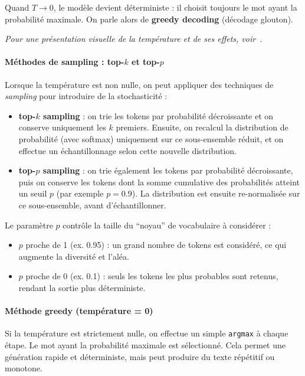 \documentclass[a4paper,11pt]{article}
\begin{document}
Quand $T \to 0$, le modèle devient déterministe : il choisit toujours le mot ayant la probabilité maximale. On parle alors de \textbf{greedy decoding} (décodage glouton).

\vspace{1em}
\textit{Pour une présentation visuelle de la température et de ses effets, voir~\cite{aviral_temperature}.}

\paragraph{Méthodes de sampling : top-$k$ et top-$p$}

Lorsque la température est non nulle, on peut appliquer des techniques de \textit{sampling} pour introduire de la stochasticité :

\begin{itemize}
  \item \textbf{top-$k$ sampling} : on trie les tokens par probabilité décroissante et on conserve uniquement les $k$ premiers. Ensuite, on recalcul la distribution de probabilité (avec softmax) uniquement sur ce sous-ensemble réduit, et on effectue un échantillonnage selon cette nouvelle distribution.
  \item \textbf{top-$p$ sampling} : on trie également les tokens par probabilité décroissante, puis on conserve les tokens dont la somme cumulative des probabilités atteint un seuil $p$ (par exemple $p=0.9$). La distribution est ensuite re-normalisée sur ce sous-ensemble, avant d’échantillonner.  
\end{itemize}

Le paramètre $p$ contrôle la taille du “noyau” de vocabulaire à considérer :  
\begin{itemize}
  \item $p$ proche de 1 (ex. 0.95) : un grand nombre de tokens est considéré, ce qui augmente la diversité et l’aléa.
  \item $p$ proche de 0 (ex. 0.1) : seuls les tokens les plus probables sont retenus, rendant la sortie plus déterministe.
\end{itemize}

\paragraph{Méthode greedy (température = 0)}

Si la température est strictement nulle, on effectue un simple \texttt{argmax} à chaque étape. Le mot ayant la probabilité maximale est sélectionné. Cela permet une génération rapide et déterministe, mais peut produire du texte répétitif ou monotone.
\end{document}
